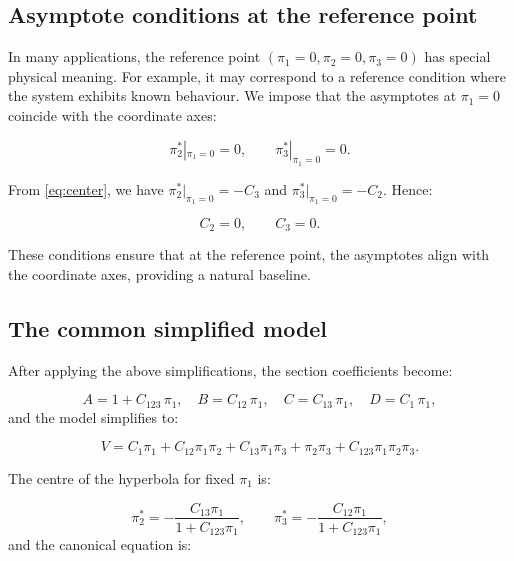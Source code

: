 \subsection{Asymptote conditions at the reference point}

In many applications, the reference point \((\pi_1=0,\pi_2=0,\pi_3=0)\) has special physical meaning. For example, it may correspond to a reference condition where the system exhibits known behaviour. We impose that the asymptotes at \(\pi_1=0\) coincide with the coordinate axes:

\begin{equation}\label{eq:asymptote_conditions}
\boxed{\pi_2^*|_{\pi_1=0} = 0,\qquad \pi_3^*|_{\pi_1=0} = 0.}
\end{equation}

From \eqref{eq:center}, we have \(\pi_2^*|_{\pi_1=0} = -C_3\) and \(\pi_3^*|_{\pi_1=0} = -C_2\). Hence:

\begin{equation}\label{eq:w2w3_conditions}
\boxed{C_2 = 0,\qquad C_3 = 0.}
\end{equation}

These conditions ensure that at the reference point, the asymptotes align with the coordinate axes, providing a natural baseline.

\subsection{The common simplified model}

After applying the above simplifications, the section coefficients become:

\begin{equation}\label{eq:ABCD_simplified}
A = 1 + C_{123}\,\pi_1,\quad
B = C_{12}\,\pi_1,\quad
C = C_{13}\,\pi_1,\quad
D = C_1\,\pi_1,
\end{equation}
and the model simplifies to:

\begin{equation}\label{eq:simplified_model}
\boxed{
V = C_1\pi_1
    + C_{12}\pi_1\pi_2
    + C_{13}\pi_1\pi_3
    + \pi_2\pi_3
    + C_{123}\pi_1\pi_2\pi_3.
}
\end{equation}

The centre of the hyperbola for fixed \(\pi_1\) is:

\begin{equation}\label{eq:center_simplified}
\pi_2^* = -\frac{C_{13}\pi_1}{1 + C_{123}\pi_1},\qquad
\pi_3^* = -\frac{C_{12}\pi_1}{1 + C_{123}\pi_1},
\end{equation}
and the canonical equation is:

